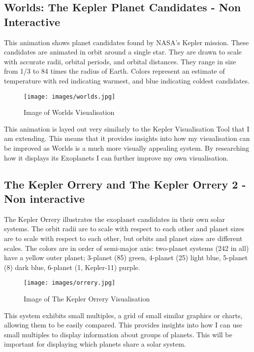 \documentclass[11pt
              , a4paper
              , twoside
              , openright
              ]{report}
\begin{document}
\subsection{Worlds: The Kepler Planet Candidates - Non Interactive}
 This animation \cite{worlds} shows  planet candidates found by NASA's Kepler
mission. These candidates are animated in orbit around a single star. They are
drawn to scale with accurate radii, orbital periods, and orbital distances. They
range in size from 1/3 to 84 times the radius of Earth. Colors represent an
estimate of temperature with red indicating warmest, and blue indicating coldest
candidates. 
\begin{figure}[h!]
  \centering
      \texttt{[image: images/worlds.jpg]}
  \caption{Image of Worlds Visualisation}
\end{figure}
This animation is layed out very similarly to the Kepler Visualisation Tool that
I am extending. This means that it provides insights into how my visualisation
can be improved as Worlds is a much more visually appealing system. By
researching how it displays its Exoplanets I can further improve my own
visualisation.

\subsection{The Kepler Orrery and The Kepler Orrery 2 - Non interactive}
The Kepler Orrery \cite{orrery} illustrates the exoplanet candidates in their
own solar systems. The orbit radii are to scale with respect to each other and
planet sizes are to scale with respect to each other, but orbits and planet
sizes are different scales. The colors are in order of semi-major axis:
two-planet systems (242 in all) have a yellow outer planet; 3-planet (85) green,
4-planet (25) light blue, 5-planet (8) dark blue, 6-planet (1, Kepler-11)
purple. 
\clearpage
\begin{figure}[h!]
  \centering
      \texttt{[image: images/orrery.jpg]}
  \caption{Image of The Kepler Orrery Visualisation}
\end{figure}
This system exhibits small multiples, a grid of small similar graphics or
charts, allowing them to be easily compared. This provides insights into how I
can use small multiples to display information about groups of planets. This
will be important for displaying which planets share a solar system.
\end{document}

